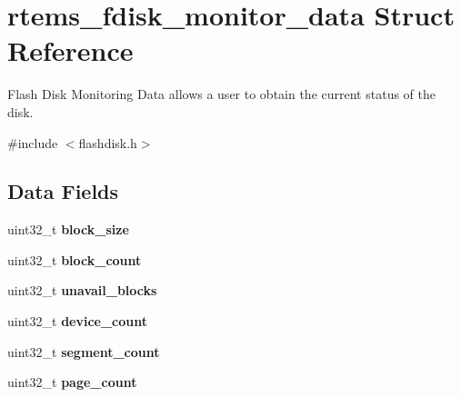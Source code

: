 \hypertarget{structrtems__fdisk__monitor__data}{}\section{rtems\+\_\+fdisk\+\_\+monitor\+\_\+data Struct Reference}
\label{structrtems__fdisk__monitor__data}


Flash Disk Monitoring Data allows a user to obtain the current status of the disk.  




{\ttfamily \#include $<$flashdisk.\+h$>$}

\subsection*{Data Fields}
\begin{DoxyCompactItemize}
\item 
\mbox{\label{structrtems__fdisk__monitor__data_a4283dc5b2a08ac868ce0cf2c4b92ca5c}} 
uint32\+\_\+t {\bfseries block\+\_\+size}
\item 
\mbox{\label{structrtems__fdisk__monitor__data_a6b2f750a6d36c523f46e077c766e804e}} 
uint32\+\_\+t {\bfseries block\+\_\+count}
\item 
\mbox{\label{structrtems__fdisk__monitor__data_aeafa5e548257b3c511e55f580a46e2f4}} 
uint32\+\_\+t {\bfseries unavail\+\_\+blocks}
\item 
\mbox{\label{structrtems__fdisk__monitor__data_a7cff334aa99dc65ce17cbe3790dce344}} 
uint32\+\_\+t {\bfseries device\+\_\+count}
\item 
\mbox{\label{structrtems__fdisk__monitor__data_a6ae70efb5d57a913cb6272e3e072fab9}} 
uint32\+\_\+t {\bfseries segment\+\_\+count}
\item 
\mbox{\label{structrtems__fdisk__monitor__data_a05d5eb085755bebb44246b6f4eba57b4}} 
uint32\+\_\+t {\bfseries page\+\_\+count}
\item 
\mbox{\label{structrtems__fdisk__monitor__data_ad4e33ab7a3c4ca5c9ade19569d928d0c}} 

\end{DoxyCompactItemize}
